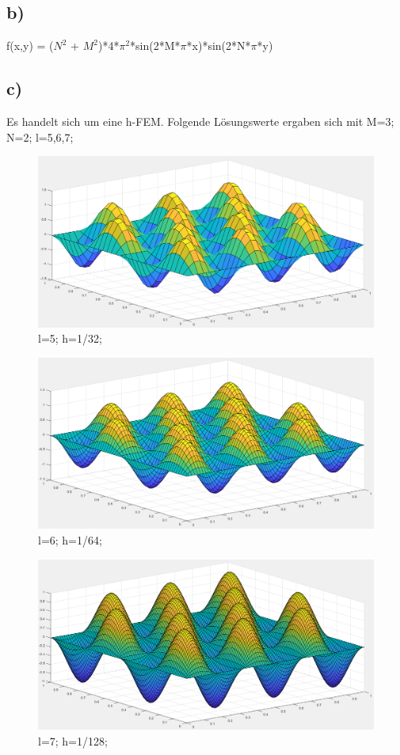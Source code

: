 \documentclass{article}
\begin{document}
	\subsection{b)}
	f(x,y) = ($N^2$ + $M^2$)*4*$\pi^2$*sin(2*M*$\pi$*x)*sin(2*N*$\pi$*y)
	\subsection{c)}
	Es handelt sich um eine h-FEM.  \newline
	Folgende Lösungswerte ergaben sich mit M=3; N=2; l=5,6,7;  \newline
\begin{figure}
	\includegraphics[width=0.8\linewidth]{Aufgaben-Ressourcen/A5L5M3N2.png} 
		\caption{l=5; h=1/32;}
\end{figure}
\begin{figure}
	\includegraphics[width=0.8\linewidth]{Aufgaben-Ressourcen/A5L6M3N2.png} 
		\caption{l=6; h=1/64;}
\end{figure}
\begin{figure}
	\includegraphics[width=0.8\linewidth]{Aufgaben-Ressourcen/A5L7M3N2.png}
		\caption{l=7; h=1/128;}
\end{figure}
\end{document}
